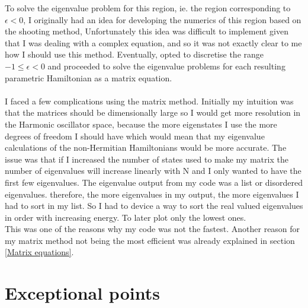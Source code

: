 \documentclass[10pt, a4paper, singlespacing, headsepline]{report}
\begin{document}
To solve the eigenvalue problem for this region, ie. the region corresponding to $\epsilon < 0$, I originally had an idea for developing the numerics of this region based on the shooting method\cite{N_R}, Unfortunately this idea was difficult to implement given that I was dealing with a complex equation, and so it was not exactly clear to me how I should use this method. Eventually, opted to discretise the range $-1 \leq \epsilon < 0$ and proceeded to solve the eigenvalue problems for each resulting parametric Hamiltonian as a matrix equation.\\\\
I faced a few complications using the matrix method. Initially my intuition was that the matrices should be dimensionally large so I would get more resolution in the Harmonic oscillator space, because the more eigenstates I use the more degrees of freedom I should have which would mean that my eigenvalue calculations of the non-Hermitian Hamiltonians would be more accurate. The issue was that if I increased the number of states used to make my matrix the number of eigenvalues will increase linearly with N and I only wanted to have the first few eigenvalues. The eigenvalue output from my code was a list or disordered eigenvalues. therefore, the more eigenvalues in my output, the more eigenvalues I had to sort in my list. So I had to device a way to sort the real valued eigenvalues in order with increasing energy. To later plot only the lowest ones.\\
This was one of the reasons why my code was not the fastest. Another reason for my matrix method not being the most efficient was already explained in section \ref{Matrix equations}.

\section{Exceptional points}\label{EPs}
\end{document}
